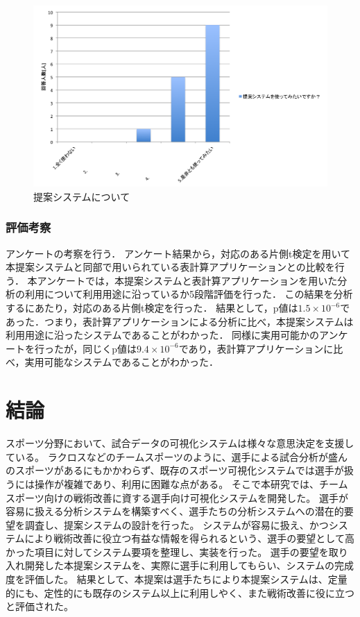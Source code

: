 \documentclass[sotsuron]{kuee}
\begin{document}
			\begin{figure}
				\begin{center}
					\includegraphics[width=\linewidth]{./png/result08.png}
				\end{center}
				\caption{提案システムについて}
		  		\label{fig:result08}
			\end{figure}
		\subsection{評価考察}
			アンケートの考察を行う．
			アンケート結果から，対応のある片側t検定を用いて本提案システムと同部で用いられている表計算アプリケーションとの比較を行う．
			本アンケートでは，本提案システムと表計算アプリケーションを用いた分析の利用について利用用途に沿っているか5段階評価を行った．
			この結果を分析するにあたり，対応のある片側t検定を行った．
			結果として，p値は$1.5 \times 10^{-6}$であった．つまり，表計算アプリケーションによる分析に比べ，本提案システムは利用用途に沿ったシステムであることがわかった．
			同様に実用可能かのアンケートを行ったが，同じくp値は$9.4 \times 10^{-6}$であり，表計算アプリケーションに比べ，実用可能なシステムであることがわかった．

\chapter{結論}
%
スポーツ分野において、試合データの可視化システムは様々な意思決定を支援している。
%
ラクロスなどのチームスポーツのように、選手による試合分析が盛んのスポーツがあるにもかかわらず、既存のスポーツ可視化システムでは選手が扱うには操作が複雑であり、利用に困難な点がある。
%
そこで本研究では、チームスポーツ向けの戦術改善に資する選手向け可視化システムを開発した。
選手が容易に扱える分析システムを構築すべく、選手たちの分析システムへの潜在的要望を調査し、提案システムの設計を行った。
システムが容易に扱え、かつシステムにより戦術改善に役立つ有益な情報を得られるという、選手の要望として高かった項目に対してシステム要項を整理し、実装を行った。
選手の要望を取り入れ開発した本提案システムを、実際に選手に利用してもらい、システムの完成度を評価した。
結果として、本提案は選手たちにより本提案システムは、定量的にも、定性的にも既存のシステム以上に利用しやく、また戦術改善に役に立つと評価された。
\end{document}
